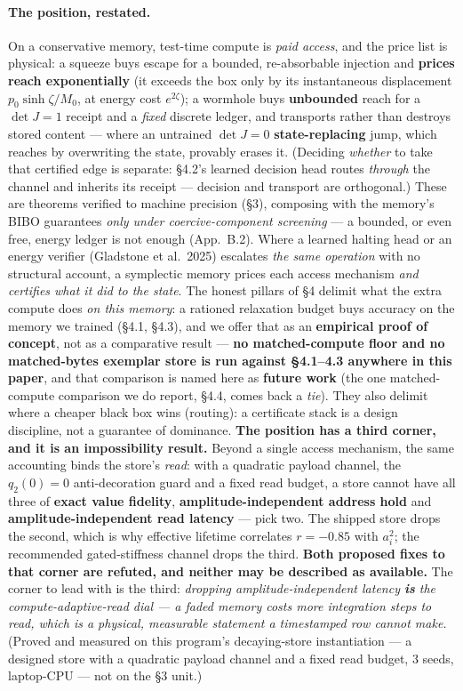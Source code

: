 \documentclass[11pt]{article}
\newcommand{\detJ}{\det J}
\begin{document}
\paragraph{The position, restated.} On a conservative memory, test-time compute is \emph{paid access}, and the price list is physical: a squeeze buys escape for a bounded, re-absorbable injection and \textbf{prices reach exponentially} (it exceeds the box only by its instantaneous displacement $p_0\sinh\zeta/M_0$, at energy cost $e^{2\zeta}$); a wormhole buys \textbf{unbounded} reach for a $\detJ=1$ receipt and a \emph{fixed} discrete ledger, and transports rather than destroys stored content --- where an untrained $\detJ=0$ \textbf{state-replacing} jump, which reaches by overwriting the state, provably erases it. (Deciding \emph{whether} to take that certified edge is separate: \S4.2's learned decision head routes \emph{through} the channel and inherits its receipt --- decision and transport are orthogonal.) These are theorems verified to machine precision (\S3), composing with the memory's BIBO guarantees \emph{only under coercive-component screening} --- a bounded, or even free, energy ledger is not enough (App.~B.2). Where a learned halting head or an energy verifier (Gladstone et al.\ 2025) escalates \emph{the same operation} with no structural account, a symplectic memory prices each access mechanism \emph{and certifies what it did to the state}. The honest pillars of \S4 delimit what the extra compute does \emph{on this memory}: a rationed relaxation budget buys accuracy on the memory we trained (\S4.1, \S4.3), and we offer that as an \textbf{empirical proof of concept}, not as a comparative result --- \textbf{no matched-compute floor and no matched-bytes exemplar store is run against \S4.1--4.3 anywhere in this paper}, and that comparison is named here as \textbf{future work} (the one matched-compute comparison we do report, \S4.4, comes back a \emph{tie}). They also delimit where a cheaper black box wins (routing): a certificate stack is a design discipline, not a guarantee of dominance. \textbf{The position has a third corner, and it is an impossibility result.} Beyond a single access mechanism, the same accounting binds the store's \emph{read}: with a quadratic payload channel, the $q_2(0)=0$ anti-decoration guard and a fixed read budget, a store cannot have all three of \textbf{exact value fidelity}, \textbf{amplitude-independent address hold} and \textbf{amplitude-independent read latency} --- pick two. The shipped store drops the second, which is why effective lifetime correlates $r=-0.85$ with $a_i^2$; the recommended gated-stiffness channel drops the third. \textbf{Both proposed fixes to that corner are refuted, and neither may be described as available.} The corner to lead with is the third: \emph{dropping amplitude-independent latency \textbf{is} the compute-adaptive-read dial --- a faded memory costs more integration steps to read, which is a physical, measurable statement a timestamped row cannot make.} (Proved and measured on this program's decaying-store instantiation --- a designed store with a quadratic payload channel and a fixed read budget, $3$ seeds, laptop-CPU --- not on the \S3 unit.)
\end{document}
